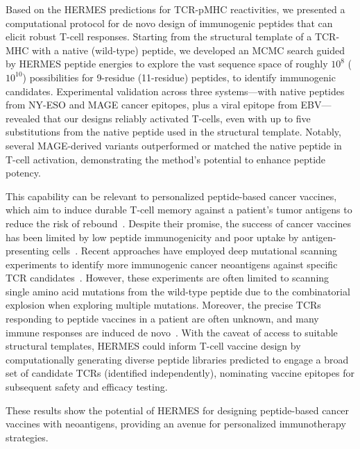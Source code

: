 Based on the HERMES predictions for TCR-pMHC reactivities, we presented a computational protocol for
{de novo} design of immunogenic peptides that can elicit robust T-cell responses. Starting from the
structural template of a TCR-MHC with a native (wild-type) peptide, we developed an MCMC search
guided by HERMES peptide energies to explore the vast sequence space of roughly $10^8$ ($10^{10}$)
possibilities for 9-residue (11-residue) peptides, to identify immunogenic candidates. Experimental
validation across three systems---with native peptides from NY-ESO and MAGE cancer epitopes, plus a
viral epitope from EBV---revealed that our designs reliably activated T-cells, even with up to five
substitutions from the native peptide used in the structural template. Notably, several MAGE-derived
variants outperformed or matched the native peptide in T-cell activation, demonstrating the method's
potential to enhance peptide potency.

This capability can be relevant to personalized peptide-based cancer vaccines, which aim to
induce durable T-cell memory against a patient's tumor antigens to reduce the risk of
rebound~\cite{Sahin2018-fv,Vormehr2019-aw,Rojas2023-nx}. Despite their promise, the success of
cancer vaccines has been limited by low peptide immunogenicity and poor uptake by antigen-presenting
cells~\cite{Song2024-di}. Recent approaches have employed deep mutational scanning experiments to
identify more immunogenic cancer {neoantigens} against specific TCR candidates~\cite{Luksza2022-gx}.
However, these experiments are often limited to scanning single amino acid mutations from the
wild-type peptide due to the combinatorial explosion when exploring multiple mutations. Moreover,
the precise TCRs responding to peptide vaccines in a patient are often unknown, and many immune
responses are induced de novo~\cite{Vormehr2019-aw}. With the caveat of access to suitable
structural templates, HERMES could inform T-cell vaccine design by computationally generating
diverse peptide libraries predicted to engage a broad set of candidate TCRs (identified
independently), nominating vaccine epitopes for subsequent safety and efficacy testing.

These results show the potential of HERMES for designing peptide-based cancer vaccines with
{neoantigens}, providing an avenue for personalized immunotherapy strategies.

